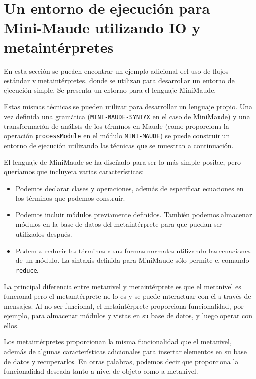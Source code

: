 \newpage
\section{Un entorno de ejecución para Mini-Maude utilizando IO y metaintérpretes}

En esta sección se pueden encontrar un ejemplo adicional del uso de flujos estándar y metaintérpretes, donde se utilizan para desarrollar un entorno de ejecución simple. Se presenta un entorno para el lenguaje MiniMaude.

Estas mismas técnicas se pueden utilizar para desarrollar un lenguaje propio. Una vez definida una gramática (\texttt{MINI-MAUDE-SYNTAX} en el caso de MiniMaude) y una transformación de análisis de los términos en Maude (como proporciona la operación \texttt{processModule} en el módulo \texttt{MINI-MAUDE}) se puede construir un entorno de ejecución utilizando las técnicas que se muestran a continuación.
\medskip

El lenguaje de MiniMaude se ha diseñado para ser lo más simple posible, pero queríamos que incluyera varias características:
\begin{itemize}
\item Podemos declarar clases y operaciones, además de especificar ecuaciones en los términos que podemos construir.

\item Podemos incluir módulos previamente definidos. También podemos almacenar módulos en la base de datos del metaintérprete para que puedan ser utilizados después.

\item Podemos reducir los términos a sus formas normales utilizando las ecuaciones de un módulo. La sintaxis definida para MiniMaude sólo permite el comando \texttt{reduce}.
\end{itemize}
\medskip

La principal diferencia entre metanivel y metaintérprete es que el metanivel es funcional pero el metaintérprete no lo es y se puede interactuar con él a través de mensajes. Al no ser funcional, el metaintérprete proporciona funcionalidad, por ejemplo, para almacenar módulos y vistas en su base de datos, y luego operar con ellos.

Los metaintérpretes proporcionan la misma funcionalidad que el metanivel, además de algunas características adicionales para insertar elementos en su base de datos y recuperarlos. En otras palabras, podemos decir que proporciona la funcionalidad deseada tanto a nivel de objeto como a metanivel.
\medskip



